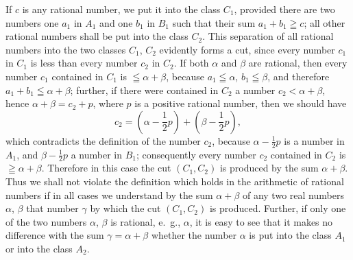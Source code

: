 \documentclass[twoside,openright]{article}
\begin{document}
If $c$ is any rational number, we put it into the class $C_1$,
provided there are two numbers one $a_1$ in $A_1$ and one $b_1$ in
$B_1$ such that their sum $a_1+b_1 \geqq c$; all other rational
numbers shall be put into the class $C_2$. This separation of all
rational numbers into the two classes $C_1$, $C_2$ evidently forms a
cut, since every number $c_1$ in $C_1$ is less than every number $c_2$
in $C_2$. If both $\alpha$ and $\beta$ are rational, then every number
$c_1$ contained in $C_1$ is $\leqq\alpha+\beta$, because
$a_1\leqq\alpha$, $b_1\leqq\beta$, and therefore
$a_1+b_1 \leqq\alpha+\beta$; further, if there were contained in $C_2$
a number $c_2<\alpha+\beta$, hence $\alpha+\beta=c_2+p$, where $p$ is
a positive rational number, then we should have
\[
c_2=(\alpha- \frac{1}{2} p)+(\beta- \frac{1}{2} p),
\]
which contradicts the definition of the number $c_2$, because
$\alpha- \frac{1}{2} p$ is a number in $A_1$, and
$\beta- \frac{1}{2} p$ a number in $B_1$; consequently every number
$c_2$ contained in $C_2$ is $\geqq\alpha+\beta$. Therefore in this
case the cut $(C_1, C_2)$ is produced by the sum $\alpha+\beta$. Thus
we shall not violate the definition which holds in the arithmetic of
rational numbers if in all cases we understand by the sum
$\alpha+\beta$ of any two real numbers $\alpha$, $\beta$ that number
$\gamma$ by which the cut $(C_1, C_2)$ is produced. Further, if only
one of the two numbers $\alpha$, $\beta$ is rational, e.~g., $\alpha$,
it is easy to see that it makes no difference with the sum
$\gamma=\alpha+\beta$ whether the number $\alpha$ is put into the
class $A_1$ or into the class $A_2$.
\end{document}
